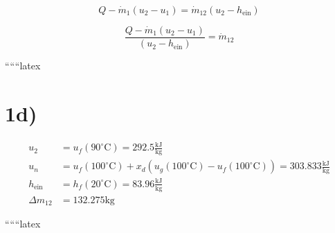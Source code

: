 \[
Q - \dot{m}_1 (u_2 - u_1) = \dot{m}_{12} (u_2 - h_{\text{ein}})
\]

\[
\frac{Q - \dot{m}_1 (u_2 - u_1)}{(u_2 - h_{\text{ein}})} = \dot{m}_{12}
\]

``````latex


\section*{1d)}

\begin{align*}
u_2 &= u_f(90^\circ \text{C}) = 292.5 \frac{\text{kJ}}{\text{kg}} \\
u_n &= u_f(100^\circ \text{C}) + x_d \left( u_g(100^\circ \text{C}) - u_f(100^\circ \text{C}) \right) = 303.833 \frac{\text{kJ}}{\text{kg}} \\
h_{\text{ein}} &= h_f(20^\circ \text{C}) = 83.96 \frac{\text{kJ}}{\text{kg}} \\
\Delta m_{12} &= 132.275 \text{kg}
\end{align*}

``````latex


